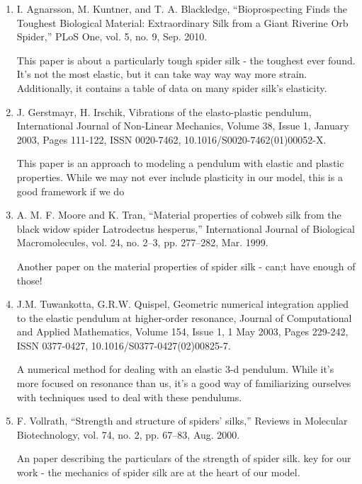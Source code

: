 \begin{enumerate}

\item I. Agnarsson, M. Kuntner, and T. A. Blackledge, “Bioprospecting Finds the Toughest Biological Material: Extraordinary Silk from a Giant Riverine Orb Spider,” PLoS One, vol. 5, no. 9, Sep. 2010.

This paper is about a particularly tough spider silk - the toughest ever found. It's not the most elastic, but it can take way way way more strain. Additionally, it contains a table of data on many spider silk's elasticity.

\item J. Gerstmayr, H. Irschik, Vibrations of the elasto-plastic pendulum, International Journal of Non-Linear Mechanics, Volume 38, Issue 1, January 2003, Pages 111-122, ISSN 0020-7462, 10.1016/S0020-7462(01)00052-X.

This paper is an approach to modeling a pendulum with elastic and plastic properties. While we may not ever include plasticity in our model, this is a good framework if we do

\item A. M. F. Moore and K. Tran, “Material properties of cobweb silk from the black widow spider Latrodectus hesperus,” International Journal of Biological Macromolecules, vol. 24, no. 2–3, pp. 277–282, Mar. 1999.

Another paper on the material properties of spider silk - can;t have enough of those!

\item J.M. Tuwankotta, G.R.W. Quispel, Geometric numerical integration applied to the elastic pendulum at higher-order resonance, Journal of Computational and Applied Mathematics, Volume 154, Issue 1, 1 May 2003, Pages 229-242, ISSN 0377-0427, 10.1016/S0377-0427(02)00825-7.

A numerical method for dealing with an elastic 3-d pendulum. While it's more focused on resonance than us, it's a good way of familiarizing ourselves with techniques used to deal with these pendulums.

\item F. Vollrath, “Strength and structure of spiders’ silks,” Reviews in Molecular Biotechnology, vol. 74, no. 2, pp. 67–83, Aug. 2000.

An paper describing the particulars of the strength of spider silk. key for our work - the mechanics of spider silk are at the heart of our model.

\end{enumerate}